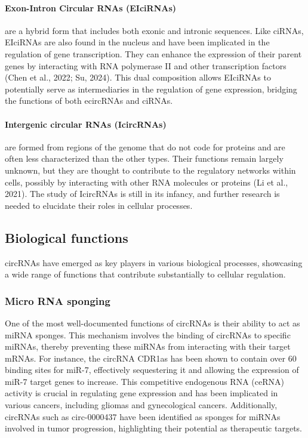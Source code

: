 \paragraph{Exon-Intron Circular RNAs (EIciRNAs)} are a hybrid form that
includes both
exonic and intronic sequences.
Like ciRNAs, EIciRNAs are also found in the nucleus and have been implicated in
the regulation of gene transcription.
They can enhance the expression of their parent genes by interacting with RNA
polymerase II and other transcription factors (Chen et al., 2022; Su, 2024).
This dual composition allows EIciRNAs to potentially serve as intermediaries in
the regulation of gene expression, bridging the functions of both ecircRNAs and
ciRNAs.

\paragraph{Intergenic circular RNAs (IcircRNAs)} are formed from regions of the
genome
that do not code for proteins and are often less characterized than the other
types.
Their functions remain largely unknown, but they are thought to contribute to
the regulatory networks within cells, possibly by interacting with other RNA
molecules or proteins (Li et al., 2021).
The study of IcircRNAs is still in its infancy, and further research is needed
to elucidate their roles in cellular processes.

\subsection{Biological functions}
circRNAs have emerged as key players in various biological processes,
showcasing
a wide range of functions that contribute substantially to cellular regulation.

\subsubsection{Micro RNA sponging}
One of the most well-documented functions of circRNAs is their ability to act
as miRNA sponges.
This mechanism involves the binding of circRNAs to specific miRNAs, thereby
preventing these miRNAs from interacting with their target mRNAs.
For instance, the circRNA CDR1as has been shown to contain over 60 binding
sites for miR-7, effectively sequestering it and allowing the expression of
miR-7 target genes to
increase\supercite{guo_expanded_2014,yuan_regulatory_2020}.
This competitive endogenous RNA (ceRNA) activity is crucial in regulating gene
expression and has been implicated in various cancers, including gliomas and
gynecological cancers\supercite{dong_expression_2020,song_circular_2016}.
Additionally, circRNAs such as circ-0000437 have been identified as sponges for
miRNAs involved in tumor progression, highlighting their potential as
therapeutic targets\supercite{li_peptide_2021,cui_circular_2022}.

